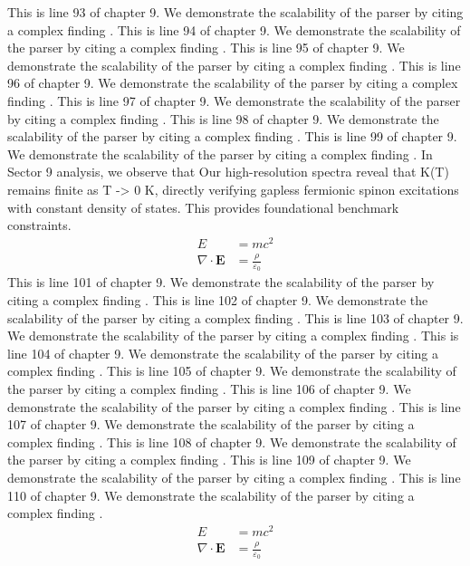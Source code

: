This is line 93 of chapter 9. We demonstrate the scalability of the parser by citing a complex finding \cite{ref9_93}.
This is line 94 of chapter 9. We demonstrate the scalability of the parser by citing a complex finding \cite{ref9_94}.
This is line 95 of chapter 9. We demonstrate the scalability of the parser by citing a complex finding \cite{ref9_95}.
This is line 96 of chapter 9. We demonstrate the scalability of the parser by citing a complex finding \cite{ref9_96}.
This is line 97 of chapter 9. We demonstrate the scalability of the parser by citing a complex finding \cite{ref9_97}.
This is line 98 of chapter 9. We demonstrate the scalability of the parser by citing a complex finding \cite{ref9_98}.
This is line 99 of chapter 9. We demonstrate the scalability of the parser by citing a complex finding \cite{ref9_99}.
In Sector 9 analysis, we observe that Our high-resolution spectra reveal that K(T) remains finite as T -> 0 K, directly verifying gapless fermionic spinon excitations with constant density of states. This provides foundational benchmark constraints.
\begin{align*}
  E &= mc^2 \\
  \nabla \cdot \mathbf{E} &= \frac{\rho}{\varepsilon_0}
\end{align*}
This is line 101 of chapter 9. We demonstrate the scalability of the parser by citing a complex finding \cite{ref9_101}.
This is line 102 of chapter 9. We demonstrate the scalability of the parser by citing a complex finding \cite{ref9_102}.
This is line 103 of chapter 9. We demonstrate the scalability of the parser by citing a complex finding \cite{ref9_103}.
This is line 104 of chapter 9. We demonstrate the scalability of the parser by citing a complex finding \cite{ref9_104}.
This is line 105 of chapter 9. We demonstrate the scalability of the parser by citing a complex finding \cite{ref9_105}.
This is line 106 of chapter 9. We demonstrate the scalability of the parser by citing a complex finding \cite{ref9_106}.
This is line 107 of chapter 9. We demonstrate the scalability of the parser by citing a complex finding \cite{ref9_107}.
This is line 108 of chapter 9. We demonstrate the scalability of the parser by citing a complex finding \cite{ref9_108}.
This is line 109 of chapter 9. We demonstrate the scalability of the parser by citing a complex finding \cite{ref9_109}.
This is line 110 of chapter 9. We demonstrate the scalability of the parser by citing a complex finding \cite{ref9_110}.
\begin{align*}
  E &= mc^2 \\
  \nabla \cdot \mathbf{E} &= \frac{\rho}{\varepsilon_0}
\end{align*}
